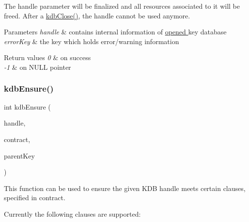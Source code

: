 The {\ttfamily handle} parameter will be finalized and all resources associated to it will be freed. After a \hyperlink{group__kdb_gadb54dc9fda17ee07deb9444df745c96f}{kdb\+Close()}, the {\ttfamily handle} cannot be used anymore.


\begin{DoxyParams}{Parameters}
{\em handle} & contains internal information of \hyperlink{group__kdb_ga6808defe5870f328dd17910aacbdc6ca}{opened } key database \\
\hline
{\em error\+Key} & the key which holds error/warning information \\
\hline
\end{DoxyParams}

\begin{DoxyRetVals}{Return values}
{\em 0} & on success \\
\hline
{\em -\/1} & on N\+U\+LL pointer \\
\hline
\end{DoxyRetVals}
\mbox{\label{group__kdb_ga0955373877575fa21275891518f8ab31}} 
\subsubsection{\texorpdfstring{kdb\+Ensure()}{kdbEnsure()}}
{\footnotesize\ttfamily int kdb\+Ensure (\begin{DoxyParamCaption}\item[{K\+DB $\ast$}]{handle,  }\item[{Key\+Set $\ast$}]{contract,  }\item[{Key $\ast$}]{parent\+Key }\end{DoxyParamCaption})}



This function can be used to ensure the given K\+DB {\ttfamily handle} meets certain clauses, specified in {\ttfamily contract}. 

Currently the following clauses are supported\+:


